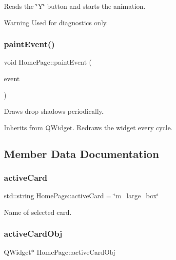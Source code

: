 Reads the \char`\"{}\+Y\char`\"{} button and starts the animation. \begin{DoxyWarning}{Warning}
Used for diagnostics only. 
\end{DoxyWarning}
\mbox{\label{classHomePage_ab3daab17f753e46efcec8968333f88b5}} 
\subsubsection{\texorpdfstring{paintEvent()}{paintEvent()}}
{\footnotesize\ttfamily void Home\+Page\+::paint\+Event (\begin{DoxyParamCaption}\item[{Q\+Paint\+Event $\ast$}]{event }\end{DoxyParamCaption})\hspace{0.3cm}{\ttfamily [protected]}}

Draws drop shadows periodically.

Inherits from Q\+Widget. Redraws the widget every cycle. 

\subsection{Member Data Documentation}
\mbox{\label{classHomePage_aa62987c2e8b75ca00ae5967870670bd4}} 
\subsubsection{\texorpdfstring{activeCard}{activeCard}}
{\footnotesize\ttfamily std\+::string Home\+Page\+::active\+Card = \char`\"{}m\+\_\+large\+\_\+box\char`\"{}\hspace{0.3cm}{\ttfamily [private]}}



Name of selected card. 

\mbox{\label{classHomePage_a36a25c775874418af5e2777c91c3393e}} 
\subsubsection{\texorpdfstring{activeCardObj}{activeCardObj}}
{\footnotesize\ttfamily Q\+Widget$\ast$ Home\+Page\+::active\+Card\+Obj\hspace{0.3cm}{\ttfamily [private]}}



